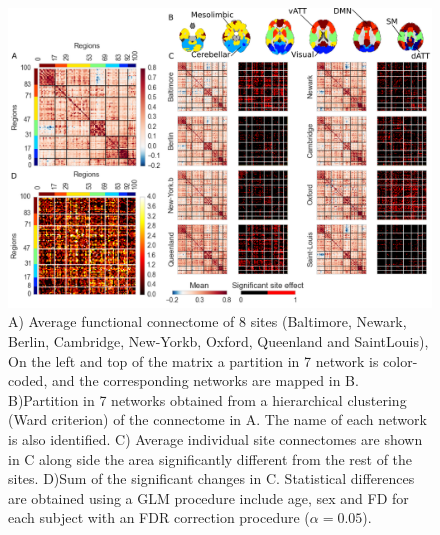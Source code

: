 \documentclass[authoryear]{elsarticle}
\begin{document}
\begin{figure}[tbp]
\begin{center}
\includegraphics[width=\linewidth]{../figures/connectome_multisite.png}
\end{center}
\caption[Connectome variability across sites]{
A) Average functional connectome of 8 sites (Baltimore, Newark, Berlin, Cambridge, New-Yorkb, Oxford, Queenland and SaintLouis), On the left and top of the matrix a partition in 7 network is color-coded, and the corresponding networks are mapped in B.
B)Partition in 7 networks obtained from a hierarchical clustering (Ward criterion) of the connectome in A. The name of each network is also identified.
C) Average individual site connectomes are shown in C along side the area significantly different from the rest of the sites. 
D)Sum of the significant changes in C. Statistical differences are obtained using a GLM procedure include age, sex and FD for each subject with an FDR correction procedure ($\alpha=0.05$).
}
\label{fig_connectome_variability}
\end{figure}
\end{document}
